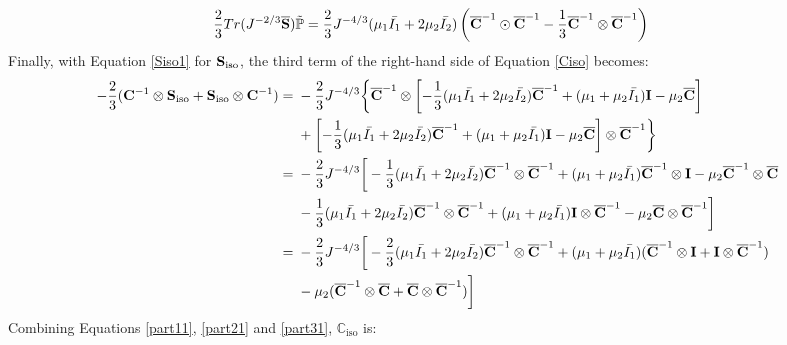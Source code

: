 \begin{equation} \label{part21}
\begin{split}
\frac{2}{3}Tr(J^{-2/3}\overline{\bold{S}})\tilde{\mathbb{P}}
&= \frac{2}{3}J^{-4/3}(\mu_1\bar{I_1} + 2\mu_2\bar{I_2})\left({\overline{\bold{C}}}^{-1} \odot {{\overline{\bold{C}}}}^{-1} - \frac{1}{3}{{\overline{\bold{C}}}}^{-1} \otimes {\overline{{\bold{C}}}}^{-1}\right)
\end{split}
\end{equation}
Finally, with Equation \ref{Siso1} for $\bold{S}_\mathrm{iso}$, the third term of the right-hand side of Equation \ref{Ciso} becomes:
\begin{equation} \label{part31}
\begin{split}
- \frac{2}{3}(\bold{C}^{-1}\otimes\bold{S}_\mathrm{iso} + \bold{S}_\mathrm{iso}\otimes \bold{C}^{-1})
= {} &
- \frac{2}{3}J^{-4/3} \bigg\{ {\overline{\bold{C}}}^{-1} \otimes \left[-\frac{1}{3}(\mu_1\bar{I_1} + 2\mu_2\bar{I_2}){\overline{\bold{C}}}^{-1} + (\mu_1 + \mu_2\bar{I_1})\bold{I} - \mu_2{\overline{\bold{C}}} \right] \\
&+
\left[-\frac{1}{3}(\mu_1\bar{I_1} + 2\mu_2\bar{I_2}){\overline{\bold{C}}}^{-1} + (\mu_1 + \mu_2\bar{I_1})\bold{I} - \mu_2{\overline{\bold{C}}} \right] \otimes {\overline{\bold{C}}}^{-1} \bigg\} \\
= {} &
- \frac{2}{3}J^{-4/3} \bigg[ -\frac{1}{3}(\mu_1\bar{I_1} + 2\mu_2\bar{I_2}) {\overline{\bold{C}}}^{-1} \otimes {\overline{\bold{C}}}^{-1} + (\mu_1 + \mu_2\bar{I_1}){\overline{\bold{C}}}^{-1}\otimes\bold{I} - \mu_2{\overline{\bold{C}}}^{-1} \otimes {\overline{\bold{C}}} \\
&-
\frac{1}{3}(\mu_1\bar{I_1} + 2\mu_2\bar{I_2}) {\overline{\bold{C}}}^{-1} \otimes {\overline{\bold{C}}}^{-1} + (\mu_1 + \mu_2\bar{I_1})\bold{I} \otimes {\overline{\bold{C}}}^{-1} - \mu_2{\overline{\bold{C}}} \otimes {\overline{\bold{C}}}^{-1} \bigg] \\
= {} &
 - \frac{2}{3}J^{-4/3} \bigg[ -\frac{2}{3}(\mu_1\bar{I_1} + 2\mu_2\bar{I_2}){\overline{\bold{C}}}^{-1} \otimes {\overline{\bold{C}}}^{-1} + (\mu_1+\mu_2\bar{I_1})({\overline{\bold{C}}}^{-1} \otimes \bold{I} + \bold{I} \otimes {\overline{\bold{C}}}^{-1})\\
&- \mu_2({\overline{\bold{C}}}^{-1} \otimes {\overline{\bold{C}}}+{\overline{\bold{C}}} \otimes {\overline{\bold{C}}}^{-1}) \bigg]
\end{split}
\end{equation}
Combining Equations \ref{part11}, \ref{part21} and \ref{part31}, $\mathbb{C}_\mathrm{iso}$ is:
